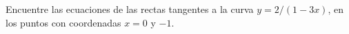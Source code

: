 \item Encuentre las ecuaciones de las rectas tangentes a la curva $y = 2/(1 - 3x)$, en los puntos con coordenadas $x = 0$ y $-1$.
